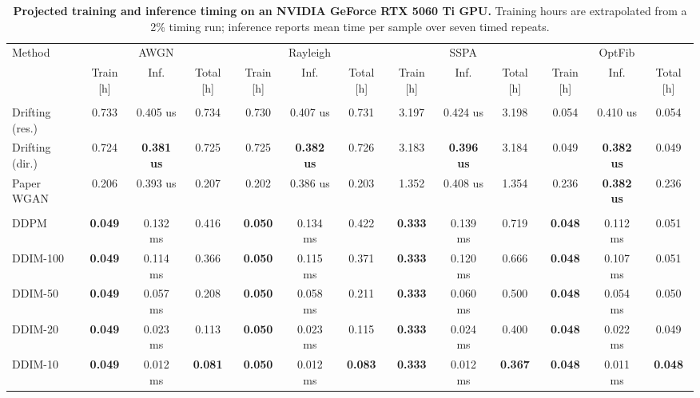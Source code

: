 \begin{table}[t]
\centering
\caption{\textbf{Projected training and inference timing on an NVIDIA GeForce RTX 5060 Ti GPU.} Training hours are extrapolated from a 2\% timing run; inference reports mean time per sample over seven timed repeats.}
\label{tab:timing-cuda}
\tablefontsize
\begin{tabular}{@{}lcccccccccccc@{}}
\toprule
Method & \multicolumn{3}{c}{AWGN} & \multicolumn{3}{c}{Rayleigh} & \multicolumn{3}{c}{SSPA} & \multicolumn{3}{c}{OptFib} \\
\cmidrule(lr){2-4} \cmidrule(lr){5-7} \cmidrule(lr){8-10} \cmidrule(lr){11-13}
 & Train [h] & Inf. & Total [h] & Train [h] & Inf. & Total [h] & Train [h] & Inf. & Total [h] & Train [h] & Inf. & Total [h] \\
\midrule
\rowcolor[gray]{0.9} \multicolumn{13}{l}{\textit{One-shot generators}} \\
\headspace Drifting (res.) & 0.733 & 0.405 us & 0.734 & 0.730 & 0.407 us & 0.731 & 3.197 & 0.424 us & 3.198 & 0.054 & 0.410 us & 0.054 \\
\headspace Drifting (dir.) & 0.724 & \textbf{0.381 us} & 0.725 & 0.725 & \textbf{0.382 us} & 0.726 & 3.183 & \textbf{0.396 us} & 3.184 & 0.049 & \textbf{0.382 us} & 0.049 \\
\headspace Paper WGAN & 0.206 & 0.393 us & 0.207 & 0.202 & 0.386 us & 0.203 & 1.352 & 0.408 us & 1.354 & 0.236 & \textbf{0.382 us} & 0.236 \\
\midrule
\rowcolor[gray]{0.9} \multicolumn{13}{l}{\textit{Diffusion samplers}} \\
\headspace DDPM & \textbf{0.049} & 0.132 ms & 0.416 & \textbf{0.050} & 0.134 ms & 0.422 & \textbf{0.333} & 0.139 ms & 0.719 & \textbf{0.048} & 0.112 ms & 0.051 \\
\headspace DDIM-100 & \textbf{0.049} & 0.114 ms & 0.366 & \textbf{0.050} & 0.115 ms & 0.371 & \textbf{0.333} & 0.120 ms & 0.666 & \textbf{0.048} & 0.107 ms & 0.051 \\
\headspace DDIM-50 & \textbf{0.049} & 0.057 ms & 0.208 & \textbf{0.050} & 0.058 ms & 0.211 & \textbf{0.333} & 0.060 ms & 0.500 & \textbf{0.048} & 0.054 ms & 0.050 \\
\headspace DDIM-20 & \textbf{0.049} & 0.023 ms & 0.113 & \textbf{0.050} & 0.023 ms & 0.115 & \textbf{0.333} & 0.024 ms & 0.400 & \textbf{0.048} & 0.022 ms & 0.049 \\
\headspace DDIM-10 & \textbf{0.049} & 0.012 ms & \textbf{0.081} & \textbf{0.050} & 0.012 ms & \textbf{0.083} & \textbf{0.333} & 0.012 ms & \textbf{0.367} & \textbf{0.048} & 0.011 ms & \textbf{0.048} \\
\bottomrule
\end{tabular}
\end{table}
